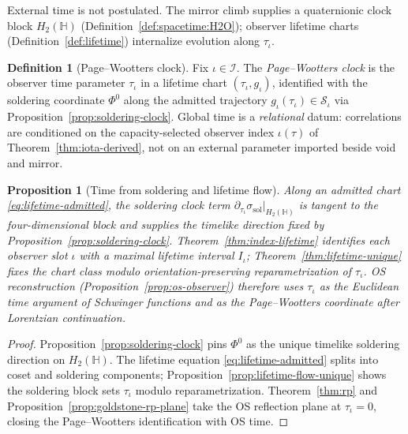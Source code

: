 \documentclass[11pt]{article}
\theoremstyle{plain}
\newtheorem{proposition}[theorem]{Proposition}
\theoremstyle{definition}
\newtheorem{definition}[theorem]{Definition}
\theoremstyle{remark}
\numberwithin{equation}{section}
\newcommand{\Quat}{\mathbb{H}}
\newcommand{\orderparam}{\Phi}
\begin{document}
External time is not postulated. The mirror climb supplies a quaternionic clock
block $H_2(\Quat)$ (Definition~\ref{def:spacetime:H2O}); observer lifetime
charts (Definition~\ref{def:lifetime}) internalize evolution along
$\tau_\iota$.

\begin{definition}[Page--Wootters clock]\label{def:page-wootters}
Fix $\iota\in\mathcal{I}$. The \emph{Page--Wootters clock} is the observer
time parameter $\tau_\iota$ in a lifetime chart $(\tau_\iota,g_\iota)$,
identified with the soldering coordinate $\orderparam^0$ along the admitted
trajectory $g_\iota(\tau_\iota)\in\mathcal{S}_\iota$ via
Proposition~\ref{prop:soldering-clock}. Global time is a \emph{relational}
datum: correlations are conditioned on the capacity-selected observer index
$\iota(\tau)$ of Theorem~\ref{thm:iota-derived}, not on an external
parameter imported beside void and mirror.
\end{definition}

\begin{proposition}[Time from soldering and lifetime flow]
\label{prop:page-wootters-derived}
Along an admitted chart \eqref{eq:lifetime-admitted}, the soldering clock term
$\partial_{\tau_\iota}\sigma_{\mathrm{sol}}|_{H_2(\Quat)}$ is tangent to the
four-dimensional block and supplies the timelike direction fixed by
Proposition~\ref{prop:soldering-clock}. Theorem~\ref{thm:index-lifetime}
identifies each observer slot $\iota$ with a maximal lifetime interval
$I_\iota$; Theorem~\ref{thm:lifetime-unique} fixes the chart class modulo
orientation-preserving reparametrization of $\tau_\iota$. OS reconstruction
(Proposition~\ref{prop:os-observer}) therefore uses $\tau_\iota$ as the
Euclidean time argument of Schwinger functions and as the Page--Wootters
coordinate after Lorentzian continuation.
\end{proposition}

\begin{proof}
Proposition~\ref{prop:soldering-clock} pins $\orderparam^0$ as the unique
timelike soldering direction on $H_2(\Quat)$. The lifetime equation
\eqref{eq:lifetime-admitted} splits into coset and soldering components;
Proposition~\ref{prop:lifetime-flow-unique} shows the soldering block sets
$\tau_\iota$ modulo reparametrization. Theorem~\ref{thm:rp} and
Proposition~\ref{prop:goldstone-rp-plane} take the OS reflection plane at
$\tau_\iota=0$, closing the Page--Wootters identification with OS time.
\end{proof}
\end{document}
